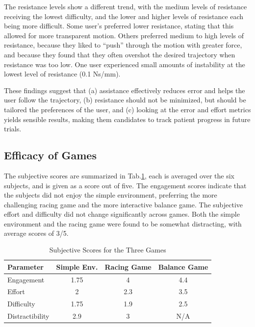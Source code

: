 \documentclass[12pt]{report}
\begin{document}
The resistance levels show a different trend, with the medium levels of resistance receiving the lowest difficulty, and the lower and higher levels of resistance each being more difficult. Some user's preferred lower resistance, stating that this allowed for more transparent motion. Others preferred medium to high levels of resistance, because they liked to ``push'' through the motion with greater force, and because they found that they often overshot the desired trajectory when resistance was too low. One user experienced small amounts of instability at the lowest level of resistance (0.1 Ns/mm).  

	These findings suggest that (a) assistance effectively reduces error and helps the user follow the trajectory, (b) resistance should not be minimized, but should be tailored the preferences of the user, and (c) looking at the error and effort metrics yields sensible results, making them candidates to track patient progress in future trials.


	
	\subsection{Efficacy of Games}
	
	
	The subjective scores are summarized in Tab.\ref{tab:games}, each is averaged over the six subjects, and is given as a score out of five. The engagement scores indicate that the subjects did not enjoy the simple environment, preferring the more challenging racing game and the more interactive balance game. The subjective effort and difficulty did not change significantly across games. Both the simple environment and the racing game were found to be somewhat distracting, with average scores of 3/5. 
	
	
	\begin{table}[h] \label{tab:games}
	\centering \doublespacing
	\caption{Subjective Scores for the Three Games}
	\begin{tabular}{l c c c  }
	\toprule
	Parameter & Simple Env. & Racing Game & Balance Game \\
	\midrule
	\rowcolor{gray!10} Engagement & 1.75 & 4 & 4.4\\
	Effort & 2 & 2.3 & 3.5 \\
	\rowcolor{gray!10} Difficulty & 1.75 & 1.9 & 2.5   \\
	Distractibility & 2.9 & 3 & N/A \\
	\bottomrule
	\end{tabular}
	\end{table}	
	
\end{document}
